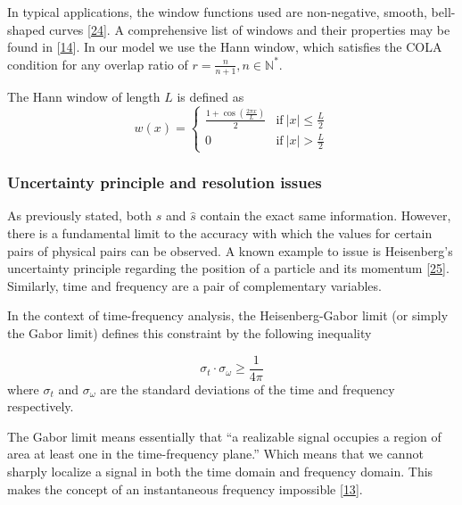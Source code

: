 \documentclass[american,]{article}
\theoremstyle{definition}
\theoremstyle{definition}
\theoremstyle{definition}
\theoremstyle{remark}
\begin{document}
In typical applications, the window functions used are non-negative,
smooth, bell-shaped curves {[}\protect\hyperlink{ref-roads2002}{24}{]}.
A comprehensive list of windows and their properties may be found in {[}\protect\hyperlink{ref-heinzel2002}{14}{]}.
In our model we use the Hann window, which satisfies the COLA condition
for any overlap ratio of \(r=\frac{n}{n+1},n\in\mathbb{N}^*\).

The Hann window of length \(L\) is defined as
\begin{equation}
w(x)=\begin{cases}
\frac{1+\cos\left(\frac{2\pi x}{L}\right)}{2} & \text{if}~\left\lvert x\right\rvert\leq\frac{L}{2}\\
0 & \text{if}~\left\lvert x\right\rvert>\frac{L}{2}
\end{cases}
\end{equation}

\hypertarget{uncertainty-principle-and-resolution-issues}{%
\subsubsection{Uncertainty principle and resolution issues}\label{uncertainty-principle-and-resolution-issues}}

As previously stated, both \(s\) and \(\hat s\) contain the exact same information.
However, there is a fundamental limit to the accuracy with which the values
for certain pairs of physical pairs can be observed.
A known example to issue is Heisenberg's uncertainty principle regarding
the position of a particle and its momentum {[}\protect\hyperlink{ref-sen2014}{25}{]}.
Similarly, time and frequency are a pair of complementary variables.

In the context of time-frequency analysis, the Heisenberg-Gabor limit
(or simply the Gabor limit) defines this constraint by the following inequality

\begin{equation}
\sigma_t\cdot\sigma_\omega\geq \frac{1}{4\pi}
\end{equation}
where \(\sigma_t\) and \(\sigma_\omega\) are the standard deviations of the time and frequency respectively.

The Gabor limit means essentially that
``a realizable signal occupies a region of area at least one in the time-frequency plane.''
Which means that we cannot sharply localize a signal in both the time domain and frequency domain.
This makes the concept of an instantaneous frequency impossible {[}\protect\hyperlink{ref-grochenig2001}{13}{]}.
\end{document}
